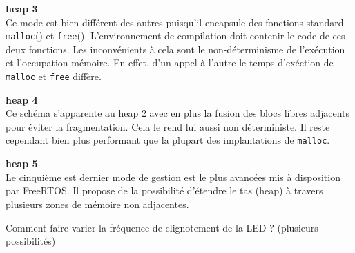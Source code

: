 \noindent
\textbf{heap 3} \\
Ce mode est bien différent des autres puisqu'il encapsule des fonctions standard \texttt{malloc}() et \texttt{free}().
L'environnement de compilation doit contenir le code de ces deux fonctions.
Les inconvénients à cela sont le non-déterminisme de l'exécution et l'occupation mémoire.
En effet, d'un appel à l'autre le temps d'exéction de \texttt{malloc} et \texttt{free} diffère.

\noindent
\textbf{heap 4} \\
Ce schéma s'apparente au heap 2 avec en plus la fusion des blocs libres adjacents pour éviter la fragmentation.
Cela le rend lui aussi non déterministe.
Il reste cependant bien plus performant que la plupart des implantations de \texttt{malloc}.

\noindent
\textbf{heap 5} \\
Le cinquième est dernier mode de gestion est le plus avancées mis à disposition par FreeRTOS.
Il propose de la possibilité d'étendre le tas (heap) à travers plusieurs zones de mémoire non adjacentes.



Comment faire varier la fréquence de clignotement de la LED ? (plusieurs possibilités)
